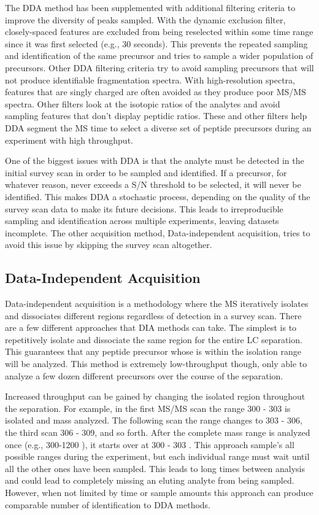 The DDA method has been supplemented with additional filtering criteria to improve the diversity of \mz{} peaks sampled. With the dynamic exclusion filter, closely-spaced \mz{} features are excluded from being reselected within some time range since it was first selected (e.g., 30 seconds). This prevents the repeated sampling and identification of the same precursor and tries to sample a wider population of precursors. Other DDA filtering criteria try to avoid sampling precursors that will not produce identifiable fragmentation spectra. With high-resolution spectra, \mz{} features that are singly charged are often avoided as they produce poor MS/MS spectra. Other filters look at the isotopic ratios of the analytes and avoid sampling features that don't display peptidic ratios. These and other filters help DDA segment the MS time to select a diverse set of peptide precursors during an experiment with high throughput.

One of the biggest issues with DDA is that the analyte must be detected in the initial survey scan in order to be sampled and identified. If a precursor, for whatever reason, never exceeds a S/N threshold to be selected, it will never be identified. This makes DDA a stochastic process, depending on the quality of the survey scan data to make its future decisions. This leads to irreproducible sampling and identification across multiple experiments, leaving datasets incomplete. The other acquisition method, Data-independent acquisition, tries to avoid this issue by skipping the survey scan altogether.

\subsection*{Data-Independent Acquisition}
Data-independent acquisition is a methodology where the MS iteratively isolates and dissociates different \mz{} regions regardless of detection in a survey scan. There are a few different approaches that DIA methods can take. The simplest is to repetitively isolate and dissociate the same \mz{} region for the entire LC separation. This guarantees that any peptide precursor whose \mz{} is within the isolation range will be analyzed. This method is extremely low-throughput though, only able to analyze a few dozen different precursors over the course of the separation.

Increased throughput can be gained by changing the isolated \mz{} region throughout the separation. For example, in the first MS/MS scan the \mz{} range 300 - 303 is isolated and mass analyzed. The following scan the \mz{} range changes to 303 - 306, the third scan 306 - 309, and so forth. After the complete mass range is analyzed once (e.g., 300-1200 \mz{}), it starts over at 300 - 303 \mz{}. This approach sample's all possible \mz{} ranges during the experiment, but each individual \mz{} range must wait until all the other ones have been sampled. This leads to long times between analysis and could lead to completely missing an eluting analyte from being sampled. However, when not limited by time or sample amounts this approach can produce comparable number of identification to DDA methods.\cite{panda} 

